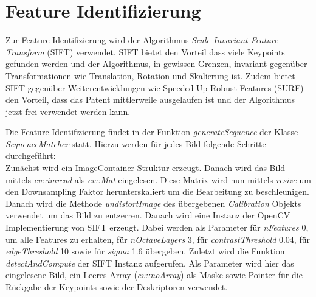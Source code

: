 \section{Feature Identifizierung}\label{sec:feature-identification}
Zur Feature Identifizierung wird der Algorithmus \emph{Scale-Invariant Feature Transform} (SIFT) verwendet.
SIFT bietet den Vorteil dass viele Keypoints gefunden werden und der Algorithmus, in gewissen Grenzen, invariant gegenüber Transformationen wie Translation, Rotation und Skalierung ist.
Zudem bietet SIFT gegenüber Weiterentwicklungen wie Speeded Up Robust Features (SURF) den Vorteil, dass das Patent mittlerweile ausgelaufen ist und der Algorithmus jetzt frei verwendet werden kann.

Die Feature Identifizierung findet in der Funktion \emph{generateSequence} der Klasse \emph{SequenceMatcher} statt.
Hierzu werden für jedes Bild folgende Schritte durchgeführt:\\
Zunächst wird ein ImageContainer-Struktur erzeugt.
Danach wird das Bild mittels \emph{cv::imread} als \emph{cv::Mat} eingelesen.
Diese Matrix wird nun mittels \emph{resize} um den Downsampling Faktor herunterskaliert um die Bearbeitung zu beschleunigen.
Danach wird die Methode \emph{undistortImage} des übergebenen \emph{Calibration} Objekts verwendet um das Bild zu entzerren.
Danach wird eine Instanz der OpenCV Implementierung von SIFT erzeugt.
Dabei werden als Parameter für \emph{nFeatures} 0, um alle Features zu erhalten, für \emph{nOctaveLayers} 3, für \emph{contrastThreshold} 0.04, für \emph{edgeThreshold} 10 sowie für \emph{sigma} 1.6 übergeben.
Zuletzt wird die Funktion \emph{detectAndCompute} der SIFT Instanz aufgerufen.
Als Parameter wird hier das eingelesene Bild, ein Leeres Array (\emph{cv::noArray}) als Maske sowie Pointer für die Rückgabe der Keypoints sowie der Deskriptoren verwendet.